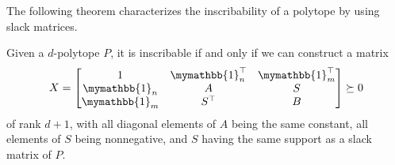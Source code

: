\documentclass[smallextended, envcountsame]{svjour3}
\begin{document}
    The following theorem characterizes the inscribability of a polytope by using slack matrices.
    \begin{theorem}\label{thm:inscri}
        Given a $d$-polytope $P$, it is inscribable if and only if we can construct a matrix
        \begin{equation*}
            X = \begin{bmatrix}
                1 & \mymathbb{1}_n^\top & \mymathbb{1}_m^\top\\
                \mymathbb{1}_n & A & S\\
                \mymathbb{1}_m & S^\top & B
            \end{bmatrix} \succeq 0
        \end{equation*}
        of rank $d+1$, with all diagonal elements of $A$ being the same constant, all elements of $S$ being nonnegative, and $S$ having the same support as a slack matrix of $P$.
    \end{theorem}
\end{document}
